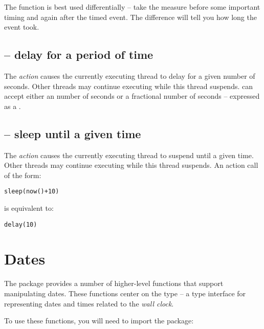 The  function is best used differentially -- take the  measure before some important timing and again after the timed event. The difference will tell you how long the event took.

\subsection{ -- delay for a period of time}
\label{time:delay}


The  \emph{action} causes the currently executing thread to delay for a given number of seconds. Other threads may continue executing while this thread suspends.  can accept either an  number of seconds or a fractional number of seconds -- expressed as a .

\subsection{ -- sleep until a given time}
\label{time:sleep}


The  \emph{action} causes the currently executing thread to suspend until a given time. Other threads may continue executing while this thread suspends. An action call of the form:
\begin{alltt}
sleep(now()+10)
\end{alltt}
is equivalent to:
\begin{alltt}
delay(10)
\end{alltt}

\section{Dates}
\label{time:date}

The  package provides a number of higher-level functions that support manipulating dates. These functions center on the  type -- a type interface for representing dates and times related to the \emph{wall clock}.

To use these functions, you will need to import the  package:


